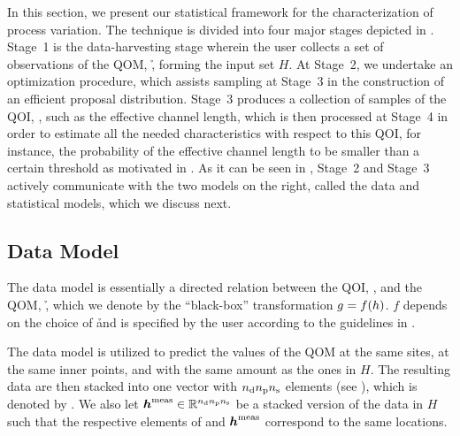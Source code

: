 In this section, we present our statistical framework for the characterization
of process variation. The technique is divided into four major stages depicted
in . Stage~1 is the data-harvesting stage wherein the user
collects a set of observations of the \ac{QOM}, \h, forming the input set $H$.
At Stage~2, we undertake an optimization procedure, which assists 
sampling at Stage~3 in the construction of an efficient proposal distribution.
Stage~3 produces a collection of samples of the \ac{QOI}, \g, such as the
effective channel length, which is then processed at Stage~4 in order to
estimate all the needed characteristics with respect to this \ac{QOI}, for
instance, the probability of the effective channel length to be smaller than a
certain threshold as motivated in . As it can be seen in
, Stage~2 and Stage~3 actively communicate with the two models
on the right, called the data and statistical models, which we discuss next.

\subsection{Data Model}

The data model is essentially a directed relation between the \ac{QOI}, \g, and
the \ac{QOM}, \h, which we denote by the ``black-box'' transformation $g =
f(h)$. $f$ depends on the choice of \h and is specified by the user according
to the guidelines in .

The data model is utilized to predict the values of the \ac{QOM} at the same
sites, at the same inner points, and with the same amount as the ones in $H$.
The resulting data are then stacked into one vector with ${n_\mathrm{d}} {n_\mathrm{p}} {n_\mathrm{s}}$ elements
(see ), which is denoted by \vh. We also let
$\boldsymbol{h}^{\mathrm{meas}} \in \mathbb{R}^{{n_\mathrm{d}} {n_\mathrm{p}} {n_\mathrm{s}}}$ be a stacked version of the data in $H$
such that the respective elements of \vh and $\boldsymbol{h}^{\mathrm{meas}}$ correspond to the
same locations.

